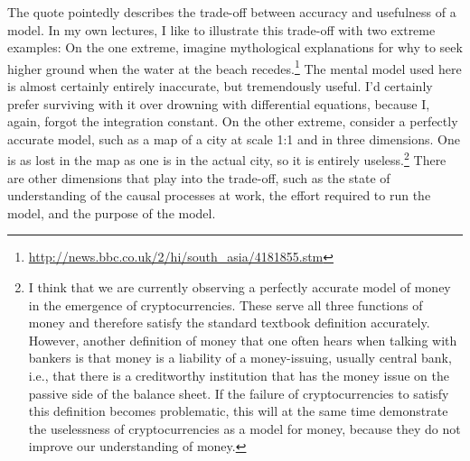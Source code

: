 \documentclass[graybox]{svmult}
\begin{document}
The quote pointedly describes the trade-off between accuracy and usefulness of a model. In my own lectures, I like to illustrate this trade-off with two extreme examples: On the one extreme, imagine mythological explanations for why to seek higher ground when the water at the beach recedes.\footnote{\url{http://news.bbc.co.uk/2/hi/south_asia/4181855.stm}} The mental model used here is almost certainly entirely inaccurate, but tremendously useful. I'd certainly prefer surviving with it over drowning with differential equations, because I, again, forgot the integration constant. On the other extreme, consider a perfectly accurate model, such as a map of a city at scale 1:1 and in three dimensions. One is as lost in the map as one is in the actual city, so it is entirely useless.\footnote{I think that we are currently observing a perfectly accurate model of money in the emergence of cryptocurrencies. These serve all three functions of money and therefore satisfy the standard textbook definition accurately. However, another definition of money that one often hears when talking with bankers is that money is a liability of a money-issuing, usually central bank, i.e., that there is a creditworthy institution that has the money issue on the passive side of the balance sheet. If the failure of cryptocurrencies to satisfy this definition becomes problematic, this will at the same time demonstrate the uselessness of cryptocurrencies as a model for money, because they do not improve our understanding of money.} There are other dimensions that play into the trade-off, such as the state of understanding of the causal processes at work, the effort required to run the model, and the purpose of the model. 
\end{document}

